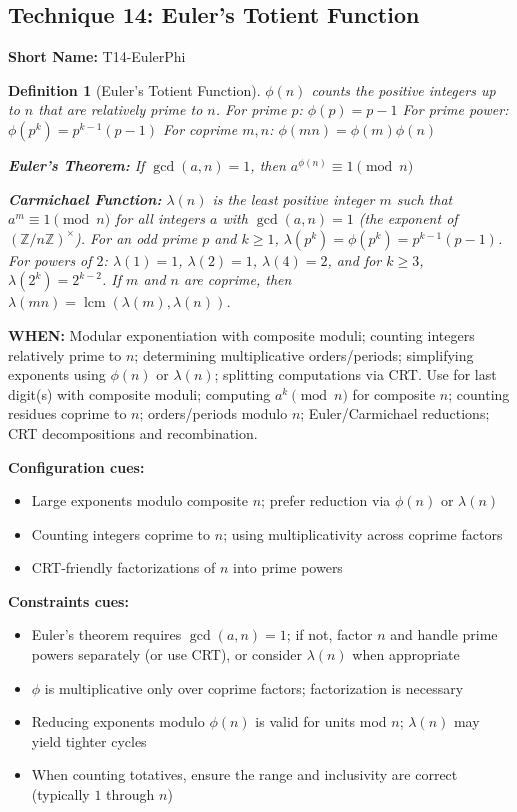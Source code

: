 \documentclass[12pt]{article}
\newtheorem{definition}{Definition}[section]
\begin{document}
\subsection{Technique 14: Euler's Totient Function}
\textbf{Short Name:} T14-EulerPhi

\begin{definition}[Euler's Totient Function]
$\phi(n)$ counts the positive integers up to $n$ that are relatively prime to $n$.
For prime $p$: $\phi(p) = p - 1$
For prime power: $\phi(p^k) = p^{k-1}(p - 1)$
For coprime $m, n$: $\phi(mn) = \phi(m)\phi(n)$

\textbf{Euler's Theorem:} If $\gcd(a, n) = 1$, then $a^{\phi(n)} \equiv 1 \pmod{n}$

\textbf{Carmichael Function:} $\lambda(n)$ is the least positive integer $m$ such that $a^m \equiv 1 \pmod{n}$ for all integers $a$ with $\gcd(a,n)=1$ (the exponent of $(\mathbb{Z}/n\mathbb{Z})^\times$). For an odd prime $p$ and $k\ge 1$,
$\lambda(p^k) = \phi(p^k) = p^{k-1}(p-1)$. For powers of $2$: $\lambda(1)=1$, $\lambda(2)=1$, $\lambda(4)=2$, and for $k\ge 3$, $\lambda(2^k)=2^{k-2}$. If $m$ and $n$ are coprime, then $\lambda(mn)=\operatorname{lcm}(\lambda(m),\lambda(n))$.
\end{definition}

\textbf{WHEN:} Modular exponentiation with composite moduli; counting integers relatively prime to $n$; determining multiplicative orders/periods; simplifying exponents using $\phi(n)$ or $\lambda(n)$; splitting computations via CRT. Use for last digit(s) with composite moduli; computing $a^k \pmod n$ for composite $n$; counting residues coprime to $n$; orders/periods modulo $n$; Euler/Carmichael reductions; CRT decompositions and recombination.

\textbf{Configuration cues:}
\begin{itemize}
    \item Large exponents modulo composite $n$; prefer reduction via $\phi(n)$ or $\lambda(n)$
    \item Counting integers coprime to $n$; using multiplicativity across coprime factors
    \item CRT-friendly factorizations of $n$ into prime powers
\end{itemize}

\textbf{Constraints cues:}
\begin{itemize}
    \item Euler's theorem requires $\gcd(a,n)=1$; if not, factor $n$ and handle prime powers separately (or use CRT), or consider $\lambda(n)$ when appropriate
    \item $\phi$ is multiplicative only over coprime factors; factorization is necessary
    \item Reducing exponents modulo $\phi(n)$ is valid for units mod $n$; $\lambda(n)$ may yield tighter cycles
    \item When counting totatives, ensure the range and inclusivity are correct (typically $1$ through $n$)
\end{itemize}
\end{document}
